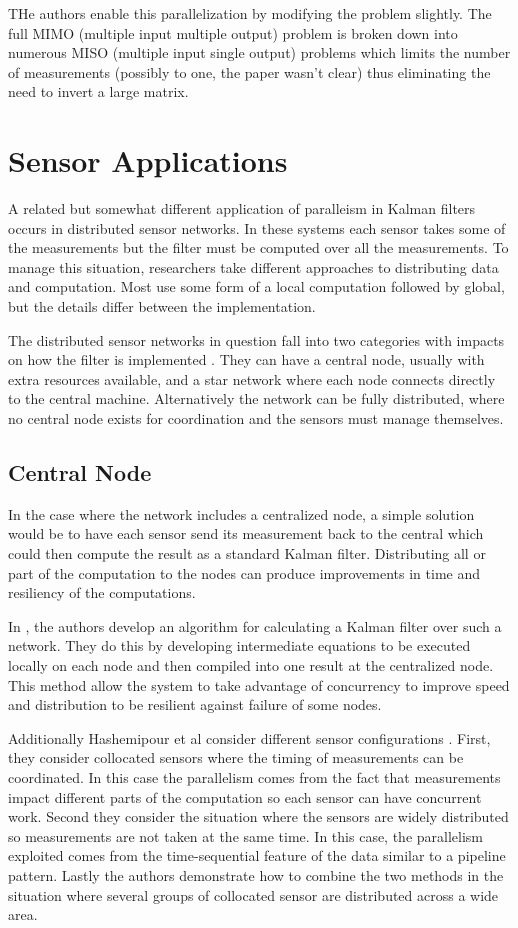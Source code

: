 \documentclass[11pt]{article}
\begin{document}
THe authors enable this parallelization by modifying the problem slightly. The full MIMO (multiple input multiple output) problem is broken down into numerous MISO (multiple input single output) problems which limits the number of measurements (possibly to one, the paper wasn't clear) thus eliminating the need to invert a large matrix.

\section{Sensor Applications}
A related but somewhat different application of paralleism in Kalman filters occurs in distributed sensor networks. In these systems each sensor takes some of the measurements but the filter must be computed over all the measurements.  To manage this situation, researchers take different approaches to distributing data and computation. Most use some form of a local computation followed by global, but the details differ between the implementation.

The distributed sensor networks in question fall into two categories with impacts on how the filter is implemented \cite{rao1991fully}. They can have a central node, usually with extra resources available, and a star network where each node connects directly to the central machine. Alternatively the network can be fully distributed, where no central node exists for coordination and the sensors must manage themselves.

\subsection{Central Node}
In the case where the network includes a centralized node, a simple solution would be to have each sensor send its measurement back to the central which could then compute the result as a standard Kalman filter. Distributing all or part of the computation to the nodes can produce improvements in time and resiliency of the computations. 

In \cite{hashemipour1988decentralized}, the authors develop an algorithm for calculating a Kalman filter over such a network. They do this by developing intermediate equations to be executed locally on each node and then compiled into one result at the centralized node. This method allow the system to take advantage of concurrency to improve speed and distribution to be resilient against failure of some nodes. 

Additionally Hashemipour et al consider different sensor configurations . First, they consider collocated sensors where the timing of measurements can be coordinated. In this case the parallelism comes from the fact that measurements impact different parts of the computation so each sensor can have concurrent work. Second they consider the situation where the sensors are widely distributed so measurements are not taken at the same time. In this case, the parallelism exploited comes from the time-sequential feature of the data similar to a pipeline pattern. Lastly the authors demonstrate how to combine the two methods in the situation where several groups of collocated sensor are distributed across a wide area.
\end{document}
